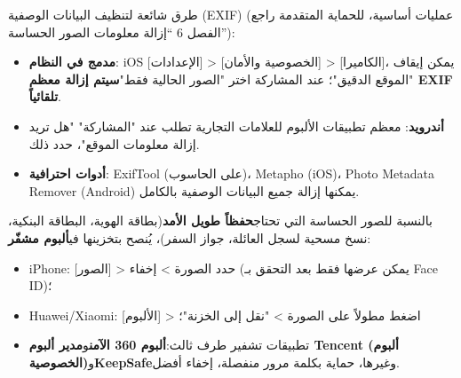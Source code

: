 طرق شائعة لتنظيف البيانات الوصفية (EXIF) (عمليات أساسية، للحماية المتقدمة راجع الفصل 6 “إزالة معلومات الصور الحساسة”):

\begin{itemize}
  \item \textbf{مدمج في النظام}: iOS [الإعدادات] > [الخصوصية والأمان] > [الكاميرا]، يمكن إيقاف "الموقع الدقيق"؛ عند المشاركة اختر "الصور الحالية فقط"\textbf{سيتم إزالة معظم EXIF تلقائياً}.
  \item \textbf{أندرويد}: معظم تطبيقات الألبوم للعلامات التجارية تطلب عند "المشاركة" "هل تريد إزالة معلومات الموقع"، حدد ذلك.
  \item \textbf{أدوات احترافية}: ExifTool (على الحاسوب)، Metapho (iOS)، Photo Metadata Remover (Android) يمكنها إزالة جميع البيانات الوصفية بالكامل.
\end{itemize}

بالنسبة للصور الحساسة التي تحتاج\textbf{حفظاً طويل الأمد}(بطاقة الهوية، البطاقة البنكية، نسخ مسحية لسجل العائلة، جواز السفر)، يُنصح بتخزينها في\textbf{ألبوم مشفّر}:

\begin{itemize}
  \item iPhone: [الصور] > حدد الصورة > إخفاء (يمكن عرضها فقط بعد التحقق بـ Face ID)؛
  \item Huawei/Xiaomi: [الألبوم] > اضغط مطولاً على الصورة > "نقل إلى الخزنة"؛
  \item تطبيقات تشفير طرف ثالث:\textbf{ألبوم 360 الآمن}و\textbf{مدير ألبوم Tencent (ألبوم الخصوصية)}و\textbf{KeepSafe}وغيرها، حماية بكلمة مرور منفصلة، إخفاء أفضل.
\end{itemize}
